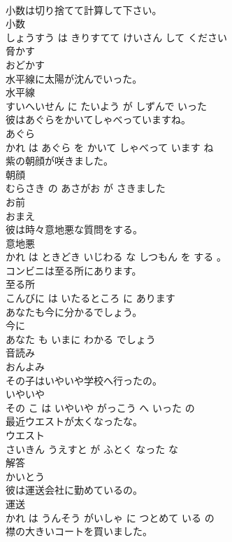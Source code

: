 \documentclass[8pt]{extreport}
\begin{document}
\begin{CJK}{UTF8}{min}
\\	小数は切り捨てて計算して下さい。	
\\	小数 
\\	しょうすう は きりすてて けいさん して ください			
\\	脅かす	
\\	おどかす		
\\	水平線に太陽が沈んでいった。	
\\	水平線 
\\	すいへいせん に たいよう が しずんで いった			
\\	彼はあぐらをかいてしゃべっていますね。	
\\	あぐら 
\\	かれ は あぐら を かいて しゃべって います ね			
\\	紫の朝顔が咲きました。	
\\	朝顔 
\\	むらさき の あさがお が さきました			
\\	お前	
\\	おまえ		
\\	彼は時々意地悪な質問をする。	
\\	意地悪 
\\	かれ は ときどき いじわる な しつもん を する 。			
\\	コンビニは至る所にあります。	
\\	至る所 
\\	こんびに は いたるところ に あります			
\\	あなたも今に分かるでしょう。	
\\	今に 
\\	あなた も いまに わかる でしょう			
\\	音読み	
\\	おんよみ		
\\	その子はいやいや学校へ行ったの。	
\\	いやいや 
\\	その こ は いやいや がっこう へ いった の			
\\	最近ウエストが太くなったな。	
\\	ウエスト 
\\	さいきん うえすと が ふとく なった な			
\\	解答	
\\	かいとう		
\\	彼は運送会社に勤めているの。	
\\	運送 
\\	かれ は うんそう がいしゃ に つとめて いる の			
\\	襟の大きいコートを買いました。	

\end{CJK}
\end{document}
